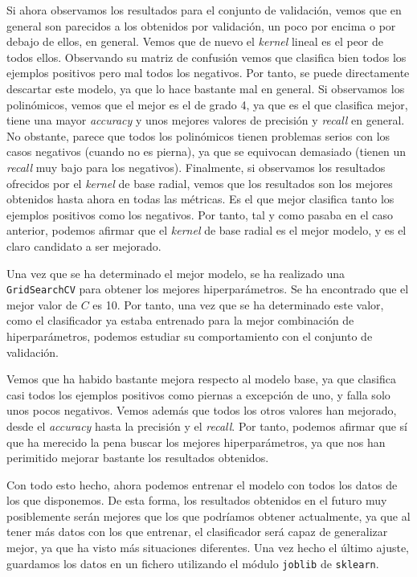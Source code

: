 \documentclass[11pt,a4paper]{article}
\begin{document}
Si ahora observamos los resultados para el conjunto de validación, vemos que en general son
parecidos a los obtenidos por validación, un poco por encima o por debajo de ellos, en general.
Vemos que de nuevo el \textit{kernel} lineal es el peor de todos ellos.
Observando su matriz de confusión vemos que clasifica bien todos los ejemplos positivos pero mal todos
los negativos. Por tanto, se puede directamente descartar este modelo, ya que lo hace
bastante mal en general. Si observamos los polinómicos, vemos que el mejor es el de grado
4, ya que es el que clasifica mejor, tiene una mayor \textit{accuracy} y unos mejores
valores de precisión y \textit{recall} en general. No obstante, parece que todos los
polinómicos tienen problemas serios con los casos negativos (cuando no es pierna), ya que se
equivocan demasiado (tienen un \textit{recall} muy bajo para los negativos).
Finalmente, si observamos los resultados ofrecidos por el \textit{kernel} de base radial,
vemos que los resultados son los mejores obtenidos hasta ahora en todas las métricas.
Es el que mejor clasifica tanto los ejemplos positivos como los negativos.
Por tanto, tal y como pasaba en el caso anterior, podemos afirmar que el \textit{kernel}
de base radial es el mejor modelo, y es el claro candidato a ser mejorado.

Una vez que se ha determinado el mejor modelo, se ha realizado una \texttt{GridSearchCV}
para obtener los mejores hiperparámetros. Se ha encontrado que el mejor valor de $C$ es 10.
Por tanto, una vez que se ha determinado este valor, como el clasificador ya estaba entrenado
para la mejor combinación de hiperparámetros, podemos estudiar su comportamiento con el
conjunto de validación.

Vemos que ha habido bastante mejora respecto al modelo base, ya que clasifica casi todos
los ejemplos positivos como piernas a excepción de uno, y falla solo unos pocos negativos. Vemos
además que todos los otros valores han mejorado, desde el \textit{accuracy} hasta la precisión
y el \textit{recall}. Por tanto, podemos afirmar que sí que ha merecido la pena
buscar los mejores hiperparámetros, ya que nos han perimitido mejorar bastante los resultados
obtenidos.

Con todo esto hecho, ahora podemos entrenar el modelo con todos los datos de los
que disponemos. De esta forma, los resultados obtenidos en el futuro muy posiblemente
serán mejores que los que podríamos obtener actualmente, ya que al tener más datos con los
que entrenar, el clasificador será capaz de generalizar mejor, ya que ha visto más situaciones
diferentes. Una vez hecho el último ajuste, guardamos los datos en un fichero utilizando
el módulo \texttt{joblib} de \texttt{sklearn}.
\end{document}

